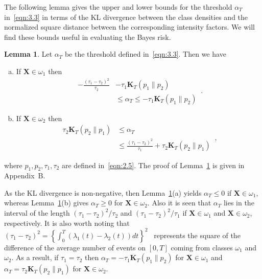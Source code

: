 \documentclass[lettersize,journal,onecolumn]{IEEEtran}
\theoremstyle{definition}
\newtheorem{lemma}{Lemma}
\begin{document}
The following lemma gives the upper and lower bounds for the threshold $\alpha_{T}$ 
in~\eqref{eqn:3.3} in terms of the KL divergence between the class densities and the 
normalized square distance between the corresponding intensity factors. We will find 
these bounds useful in evaluating the Bayes risk.
\begin{lemma}
	\label{lemma:1}
	Let $\alpha_{T}$ be the threshold defined in~\eqref{eqn:3.3}. Then we have
	\begin{enumerate}[(a)]
		\item If $\mathbf{X}\in\omega_{1}$ then
		\begin{equation}
			\begin{split}
				-\frac{\left(\tau_{1} - \tau_{2}\right)^2}{\tau_2}
				& -\tau_{1}\mathbf{K}_{T}\left(p_1 \parallel p_2\right)\\
				& \leq \alpha_{T} \leq
				-\tau_{1}\mathbf{K}_{T}\left(p_1 \parallel p_2\right)
			\end{split}
			\label{eqn:3.4a}\,.
		\end{equation}
		\item If $\mathbf{X}\in\omega_{2}$ then
		\begin{equation}
			\begin{split}
				\tau_{2}\mathbf{K}_{T}\left(p_2 \parallel p_1\right)
				& \leq \alpha_{T} \\
				& \leq \frac{\left(\tau_{1} - \tau_{2}\right)^2}{\tau_1}
				+ \tau_{2}\mathbf{K}_{T}\left(p_2 \parallel p_1\right)
			\end{split}
			\label{eqn:3.4b}\,,
		\end{equation}
	\end{enumerate}
	where $p_{1}, p_{2},\tau_{1},\tau_{2}$ are defined in~\eqref{eqn:2.5}. 
	The proof of Lemma~\ref{lemma:1} is given in Appendix~B.
\end{lemma}

As the KL divergence is non-negative, then Lemma~\ref{lemma:1}(a) yields 
$\alpha_{T}\leq0$ if $\mathbf{X}\in\omega_{1}$, whereas Lemma~\ref{lemma:1}(b) gives 
$\alpha_{T}\geq0$ for $\mathbf{X}\in\omega_{2}$. Also it is seen that $\alpha_{T}$ 
lies in the interval of the length $\left(\tau_{1}-\tau_{2}\right)^2/\tau_{2}$ and 
$\left(\tau_{1}-\tau_{2}\right)^2/\tau_{1}$ if $\mathbf{X}\in\omega_{1}$ and 
$\mathbf{X}\in\omega_{2}$, respectively. It is also worth noting that \mbox{
	$\left(\tau_{1}-\tau_{2}\right)^2=\left\{
	\int_{0}^{T}\left(\lambda_{1}(t)-\lambda_{2}(t)\right)dt
	\right\}^2$
} represents the square of the difference of the average number of events on $[0,T]$
coming from
classes $\omega_{1}$ and $\omega_{2}$. As a result, if $\tau_{1} = \tau_{2}$ then
$\alpha_{T} = -\tau_{1}\mathbf{K}_{T}\left(p_1 \parallel p_2\right)$
for $\mathbf{X}\in\omega_{1}$ and
$\alpha_{T} = \tau_{2}\mathbf{K}_{T}\left(p_2 \parallel p_1\right)$
for $\mathbf{X}\in\omega_{2}$.
\end{document}
